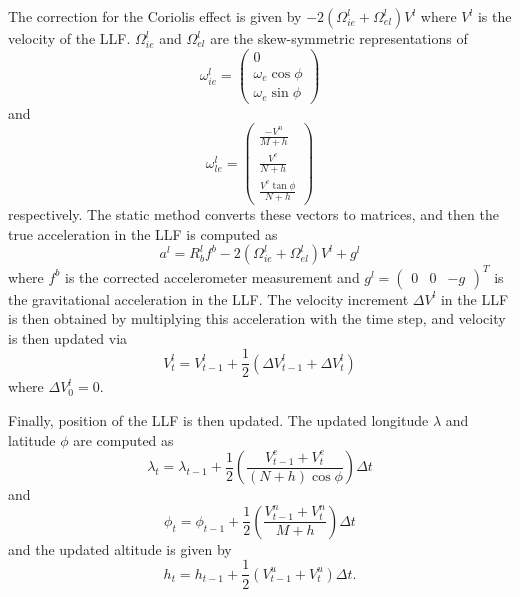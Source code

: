 \documentclass[11pt, oneside]{article}   	%
\begin{document}
The correction for the Coriolis effect is given by $-2(\Omega_{ie}^l+\Omega_{el}^l)V^l$ where $V^l$ is the velocity of the LLF.  $\Omega_{ie}^l$ and $\Omega_{el}^l$ are the skew-symmetric representations of 
$$\omega_{ie}^l=\begin{pmatrix}
0 \\
\omega_e\cos\phi \\
\omega_e\sin\phi
\end{pmatrix}$$
and
$$\omega_{le}^l=\begin{pmatrix}
\frac{-V^n}{M+h} \\[.1cm]
\frac{V^e}{N+h} \\[.1cm]
\frac{V^e\tan\phi}{N+h}
\end{pmatrix}$$
respectively.  The static method  converts these vectors to matrices, and then the true acceleration in the LLF is computed as
$$a^l=R_b^lf^b-2(\Omega_{ie}^l+\Omega_{el}^l)V^l+g^l$$
where $f^b$ is the corrected accelerometer measurement and $g^l=\begin{pmatrix}0&0&-g\end{pmatrix}^T$ is the gravitational acceleration in the LLF.  The velocity increment $\Delta V^l$ in the LLF is then obtained by multiplying this acceleration with the time step, and velocity is then updated via
$$V^l_t=V^l_{t-1}+\frac12\left(\Delta V^l_{t-1}+\Delta V^l_t\right)$$ 
where $\Delta V^l_0=0$.

Finally, position of the LLF is then updated.  The updated longitude $\lambda$ and latitude $\phi$ are computed as
$$\lambda_t=\lambda_{t-1}+\frac12\left(\frac{V^e_{t-1}+V^e_t}{(N+h)\cos\phi}\right)\Delta t$$
and
$$\phi_t=\phi_{t-1}+\frac12\left(\frac{V^n_{t-1}+V^n_t}{M+h}\right)\Delta t$$
and the updated altitude is given by
$$h_t=h_{t-1}+\frac12\left(V^u_{t-1}+V^u_t\right)\Delta t.$$
\end{document}
